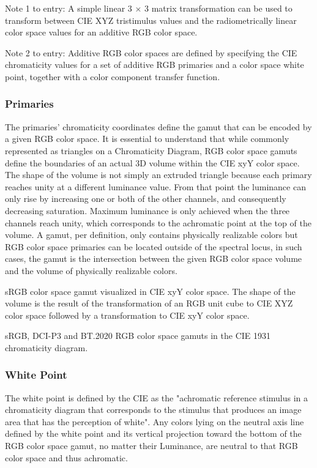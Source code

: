 Note 1 to entry: A simple linear 3 × 3 matrix transformation can be used to transform between CIE XYZ tristimulus values and the radiometrically linear color space values for an additive RGB color space.

Note 2 to entry: Additive RGB color spaces are defined by specifying the CIE chromaticity values for a set of additive RGB primaries and a color space white point, together with a color component transfer function.

\subsubsection{Primaries}

The primaries’ chromaticity coordinates define the gamut that can be encoded by a given RGB color space. It is essential to understand that while commonly represented as triangles on a Chromaticity Diagram, RGB color space gamuts define the boundaries of an actual 3D volume within the CIE xyY color space. The shape of the volume is not simply an extruded triangle because each primary reaches unity at a different luminance value. From that point the luminance can only rise by increasing one or both of the other channels, and consequently decreasing saturation. Maximum luminance is only achieved when the three channels reach unity, which corresponds to the achromatic point at the top of the volume.
A gamut, per definition, only contains physically realizable colors but RGB color space primaries can be located outside of the spectral locus, in such cases, the gamut is the intersection between the given RGB color space volume and the volume of physically realizable colors.

sRGB color space gamut visualized in CIE xyY color space. The shape of the volume is the result of the transformation of an RGB unit cube to CIE XYZ color space followed by a transformation to CIE xyY color space.


sRGB, DCI-P3 and BT.2020 RGB color space gamuts in the CIE 1931 chromaticity diagram.

\subsubsection{White Point}

The white point is defined by the CIE as the "achromatic reference stimulus in a chromaticity diagram that corresponds to the stimulus that produces an image area that has the perception of white". Any colors lying on the neutral axis line defined by the white point and its vertical projection toward the bottom of the RGB color space gamut, no matter their Luminance, are neutral to that RGB color space and thus achromatic.

